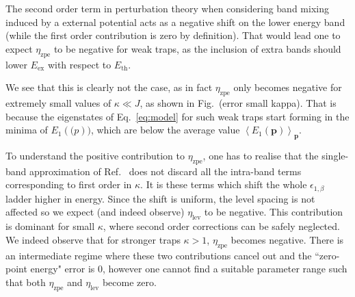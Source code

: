 \documentclass[twocolumn, 10pt, aps, superscriptaddress, floatfix, showpacs, pra, citeautoscript]{revtex4-1}
\newcommand{\vt}[1]{\mathbf{#1}}
\newcommand{\co}[2]{#2}
\renewcommand{\paragraph}{\co}
\begin{document}
\paragraph{There is a positive contribution to the zero point energy error.}  
The second order term in perturbation theory when considering band
mixing induced by a external potential acts as a negative shift on the
lower energy band (while the first order contribution is zero by
definition). That would lead one to expect $\eta_{\text{zpe}}$ to be
negative for weak traps, as the inclusion of extra bands should lower
$E_{\text{ex}}$ with respect to $E_{\text{th}}$.

\paragraph{Eigenstates for weak traps form in the minima of the band dispersion.}
We see that this is clearly not the case, as in fact
$\eta_{\text{zpe}}$ only becomes negative for extremely small values
of $\kappa \ll J$, as shown in Fig.~(error small kappa).  That
is because the eigenstates of Eq.~\eqref{eq:model} for such weak
traps start forming in the minima of $E_1(\vt(p))$, which are below
the average value $\left<E_1(\vt{p})\right>_{\vt{p}}$.


\paragraph{This contribution is due to intra-band terms.}
To understand the positive contribution to $\eta_{\text{zpe}}$, one
has to realise that the single-band approximation of
Ref.~ does not discard all the
intra-band terms corresponding to first order in $\kappa$. It is these
terms which shift the whole $\epsilon_{1,\beta}$ ladder higher in
energy. Since the shift is uniform, the level spacing is not affected
so we expect (and indeed observe) $\eta_{\text{lev}}$ to be
negative. This contribution is dominant for small $\kappa$, where
second order corrections can be safely neglected. We indeed observe
that for stronger traps $\kappa > 1$, $\eta_{\text{zpe}}$ becomes
negative. There is an intermediate regime where these two
contributions cancel out and the ``zero-point energy" error is 0,
however one cannot find a suitable parameter range such that both
$\eta_{\text{zpe}}$ and $\eta_{\text{lev}}$ become zero.
\end{document}
